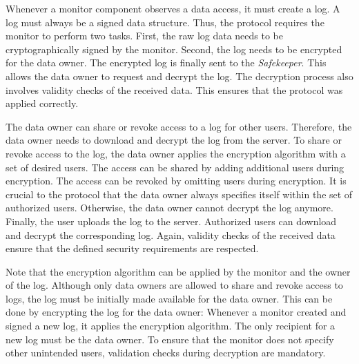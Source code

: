 \documentclass[../main.tex]{subfiles}
\begin{document}
Whenever a monitor component observes a data access, it must create a log.
A log must always be a signed data structure.
Thus, the protocol requires the monitor to perform two tasks.
First, the raw log data needs to be cryptographically signed by the monitor.
Second, the log needs to be encrypted for the data owner.
The encrypted log is finally sent to the \emph{Safekeeper}.
This allows the data owner to request and decrypt the log.
The decryption process also involves validity checks of the received data.
This ensures that the protocol was applied correctly.

The data owner can share or revoke access to a log for other users.
Therefore, the data owner needs to download and decrypt the log from the server.
To share or revoke access to the log, the data owner applies the encryption algorithm with a set of desired users.
The access can be shared by adding additional users during encryption.
The access can be revoked by omitting users during encryption.
It is crucial to the protocol that the data owner always specifies itself within the set of authorized users.
Otherwise, the data owner cannot decrypt the log anymore.
Finally, the user uploads the log to the server.
Authorized users can download and decrypt the corresponding log.
Again, validity checks of the received data ensure that the defined security requirements are respected.

Note that the encryption algorithm can be applied by the monitor and the owner of the log.
Although only data owners are allowed to share and revoke access to logs, the log must be initially made available for the data owner.
This can be done by encrypting the log for the data owner:
Whenever a monitor created and signed a new log, it applies the encryption algorithm.
The only recipient for a new log must be the data owner.
To ensure that the monitor does not specify other unintended users, validation checks during decryption are mandatory.
\end{document}
